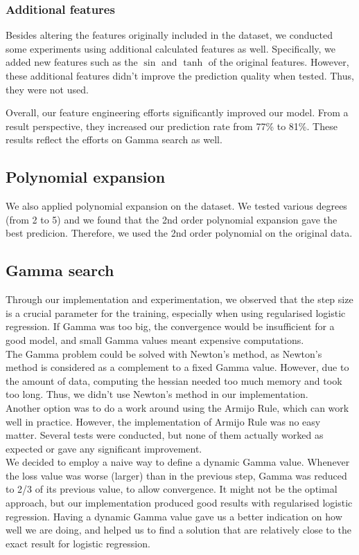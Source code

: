 \documentclass[10pt,conference,compsocconf]{IEEEtran}
\begin{document}
\subsubsection{Additional features}
Besides altering the features originally included in the dataset, we conducted some experiments using additional calculated features as well. Specifically, we added new features such as the $\sin$ and $\tanh$ of the original features. However, these additional features didn't improve the prediction quality when tested. Thus, they were not used.

Overall, our feature engineering efforts significantly improved our model. From a result perspective, they increased our prediction rate from 77\% to 81\%. These results reflect the efforts on Gamma search as well.

\subsection{Polynomial expansion}
We also applied polynomial expansion on the dataset. We tested various degrees (from 2 to 5) and we
found that the 2nd order polynomial expansion gave the best predicion. Therefore, we used the 2nd
order polynomial on the original data.

\subsection{Gamma search}

Through our implementation and experimentation, we observed that the step size is a crucial parameter for the training, especially when using regularised logistic regression. If Gamma was too big, the convergence would be insufficient for a good model, and small Gamma values meant expensive computations. \\
The Gamma problem could be solved with Newton’s method, as Newton’s method is considered as a complement to a fixed Gamma value. However, due to the amount of data, computing the hessian needed too much memory and took too long. Thus, we didn't use Newton’s method in our implementation. \\
Another option was to do a work around using the Armijo Rule, which can work well in practice. However, the implementation of Armijo Rule was no easy matter. Several tests were conducted, but none of them actually worked as expected or gave any significant improvement. \\
We decided to employ a naive way to define a dynamic Gamma value. Whenever the loss value was worse (larger) than in the previous step, Gamma was reduced to 2/3 of its previous value, to allow convergence. It might not be the optimal approach, but our implementation produced good results with regularised logistic regression.
Having a dynamic Gamma value gave us a better indication on how well we are doing, and helped us to find a solution that are relatively close to the exact result for logistic regression.
\end{document}
